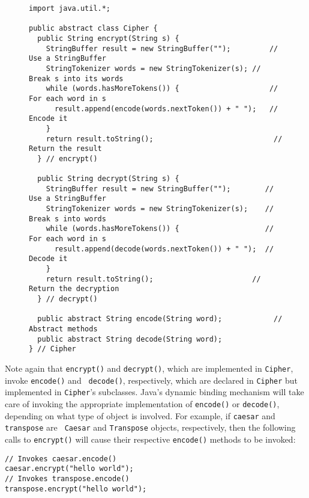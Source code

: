 \begin{figure}[h!]
\jjjprogstart
\begin{jjjlisting}[35pc]
\begin{lstlisting}
import java.util.*;

public abstract class Cipher {
  public String encrypt(String s) {
    StringBuffer result = new StringBuffer("");         // Use a StringBuffer
    StringTokenizer words = new StringTokenizer(s); // Break s into its words
    while (words.hasMoreTokens()) {                     // For each word in s
      result.append(encode(words.nextToken()) + " ");   //  Encode it
    }
    return result.toString();                            // Return the result
  } // encrypt()

  public String decrypt(String s) {
    StringBuffer result = new StringBuffer("");        // Use a StringBuffer
    StringTokenizer words = new StringTokenizer(s);    // Break s into words
    while (words.hasMoreTokens()) {                    // For each word in s
      result.append(decode(words.nextToken()) + " ");  //  Decode it
    }
    return result.toString();                       // Return the decryption
  } // decrypt()

  public abstract String encode(String word);            // Abstract methods
  public abstract String decode(String word);
} // Cipher
\end{lstlisting}
\end{jjjlisting}
\end{figure}


Note again that {\tt encrypt()} and {\tt decrypt()}, which are
implemented in \mbox{\tt Cipher}, invoke {\tt encode()} and {\tt
decode()},  respectively, which are declared in {\tt Cipher} but
implemented in {\tt Cipher}'s subclasses.  Java's dynamic binding
mechanism will take care of invoking the appropriate implementation of
{\tt encode()} or {\tt decode()}, depending on what type of object is
involved.  For example, if {\tt caesar} and {\tt transpose} are {\tt
Caesar} and {\tt Transpose} objects, respectively, then the following
calls to {\tt encrypt()} will cause their respective {\tt encode()}
methods to be invoked:

\begin{jjjlisting}
\begin{lstlisting}
// Invokes caesar.encode()
caesar.encrypt("hello world");     
// Invokes transpose.encode()
transpose.encrypt("hello world");  
\end{lstlisting}
\end{jjjlisting}

